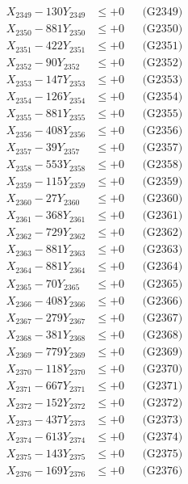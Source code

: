 \documentclass[a4paper,10pt]{article}
\begin{document}
{\begin{align}
X_{2349} - 130Y_{2349} &\leq +0 && \text{(G2349)} \\
X_{2350} - 881Y_{2350} &\leq +0 && \text{(G2350)} \\
\allowbreak
X_{2351} - 422Y_{2351} &\leq +0 && \text{(G2351)} \\
X_{2352} - 90Y_{2352} &\leq +0 && \text{(G2352)} \\
X_{2353} - 147Y_{2353} &\leq +0 && \text{(G2353)} \\
X_{2354} - 126Y_{2354} &\leq +0 && \text{(G2354)} \\
X_{2355} - 881Y_{2355} &\leq +0 && \text{(G2355)} \\
X_{2356} - 408Y_{2356} &\leq +0 && \text{(G2356)} \\
X_{2357} - 39Y_{2357} &\leq +0 && \text{(G2357)} \\
X_{2358} - 553Y_{2358} &\leq +0 && \text{(G2358)} \\
X_{2359} - 115Y_{2359} &\leq +0 && \text{(G2359)} \\
X_{2360} - 27Y_{2360} &\leq +0 && \text{(G2360)} \\
\allowbreak
X_{2361} - 368Y_{2361} &\leq +0 && \text{(G2361)} \\
X_{2362} - 729Y_{2362} &\leq +0 && \text{(G2362)} \\
X_{2363} - 881Y_{2363} &\leq +0 && \text{(G2363)} \\
X_{2364} - 881Y_{2364} &\leq +0 && \text{(G2364)} \\
X_{2365} - 70Y_{2365} &\leq +0 && \text{(G2365)} \\
X_{2366} - 408Y_{2366} &\leq +0 && \text{(G2366)} \\
X_{2367} - 279Y_{2367} &\leq +0 && \text{(G2367)} \\
X_{2368} - 381Y_{2368} &\leq +0 && \text{(G2368)} \\
X_{2369} - 779Y_{2369} &\leq +0 && \text{(G2369)} \\
X_{2370} - 118Y_{2370} &\leq +0 && \text{(G2370)} \\
\allowbreak
X_{2371} - 667Y_{2371} &\leq +0 && \text{(G2371)} \\
X_{2372} - 152Y_{2372} &\leq +0 && \text{(G2372)} \\
X_{2373} - 437Y_{2373} &\leq +0 && \text{(G2373)} \\
X_{2374} - 613Y_{2374} &\leq +0 && \text{(G2374)} \\
X_{2375} - 143Y_{2375} &\leq +0 && \text{(G2375)} \\
X_{2376} - 169Y_{2376} &\leq +0 && \text{(G2376)} \\

\end{align}}
\end{document}
